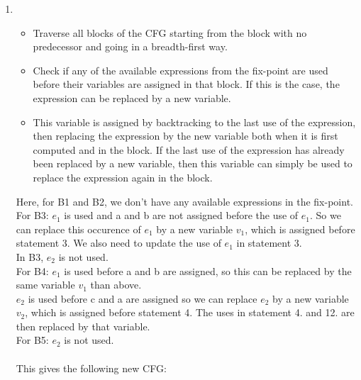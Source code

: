 \documentclass[12pt,fleqn]{article}		%
\begin{document}
\begin{enumerate}
\item 
\begin{itemize}
\item Traverse all blocks of the CFG starting from the block with no predecessor and going in a breadth-first way.
\item Check if any of the available expressions from the fix-point are used before their variables are assigned in that block. If this is the case, the expression can be replaced by a new variable.
\item This variable is assigned by backtracking to the last use of the expression, then replacing the expression by the new variable both when it is first computed and in the block. If the last use of the expression has already been replaced by a new variable, then this variable can simply be used to replace the expression again in the block.
\end{itemize}
Here, for B1 and B2, we don't have any available expressions in the fix-point.\\
For B3: $e_1$ is used and a and b are not assigned before the use of $e_1$. So we can replace this occurence of $e_1$ by a new variable $v_1$, which is assigned before statement 3. We also need to update the use of $e_1$ in statement 3.\\In B3, $e_2$ is not used.\\
For B4: $e_1$ is used before a and b are assigned, so this can be replaced by the same variable $v_1$ than above.\\
$e_2$ is used before c and a are assigned so we can replace $e_2$ by a new variable $v_2$, which is assigned before statement 4. The uses in statement 4. and 12. are then replaced by that variable.\\
For B5: $e_2$ is not used.
\\\\
This gives the following new CFG:\\
\end{enumerate}
\end{document}
